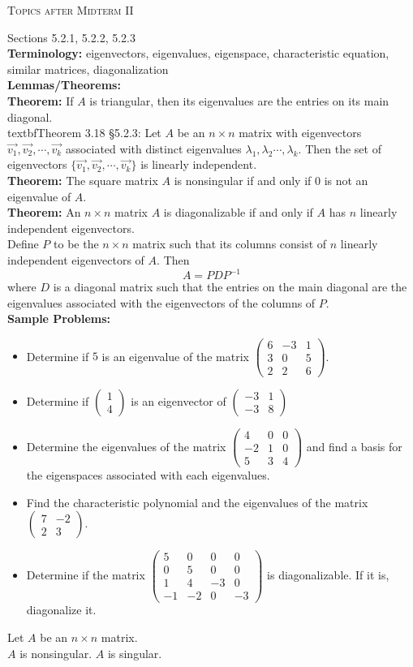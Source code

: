 \documentclass[11pt,fleqn]{article}
\newcommand{\bpm}{\begin{pmatrix}}
\newcommand{\epm}{\end{pmatrix}}
\begin{document}
\begin{center} \textsc{Topics after Midterm II} \end{center}

\noindent Sections 5.2.1, 5.2.2, 5.2.3\\

\textbf{Terminology:} eigenvectors, eigenvalues, eigenspace, characteristic equation, similar matrices, diagonalization\\

\textbf{Lemmas/Theorems:}\\
\textbf{Theorem:} If $A$ is triangular, then its eigenvalues are the entries on its main diagonal.\\
textbf{Theorem 3.18 \S 5.2.3:} Let $A$ be an $n \times n$ matrix with eigenvectors $\vec{v_1},\vec{v_2}, \cdots, \vec{v_k}$  associated with distinct eigenvalues $\lambda_1, \lambda_2\cdots,\lambda_k.$ Then the set  of eigenvectors $\{ \vec{v_1},\vec{v_2}, \cdots, \vec{v_k}\}$ is  linearly independent.\\
\textbf{Theorem:} The square matrix $A$ is nonsingular if and only if $0$ is not an eigenvalue of $A$.\\
\textbf{Theorem:} An $n \times n$ matrix $A$ is diagonalizable if and only if $A$ has $n$ linearly independent eigenvectors.\\
 
 Define $P$ to be the $n \times n$ matrix such that its columns consist of $n$ linearly independent eigenvectors of $A.$ Then $$A=PDP^{-1}$$ where $D$ is a diagonal matrix such that the entries on the main diagonal are the eigenvalues associated with the eigenvectors of the columns of $P.$\\

\textbf{Sample Problems:}\\
\begin{itemize}
\item Determine if $5$ is an eigenvalue of the matrix $\bpm 6&-3&1\\ 3&0&5 \\ 2&2&6 \epm$.
\item Determine if $\bpm 1\\4 \epm$ is an eigenvector of $\bpm -3&1\\-3&8\epm$
\item Determine the eigenvalues of the matrix $\bpm 4&0&0\\-2&1&0\\5&3&4 \epm$ and find a basis for the eigenspaces associated with each eigenvalues.
\item Find the characteristic polynomial and the eigenvalues of the matrix $\bpm 7&-2\\2&3\epm.$
\item Determine if the matrix $\bpm 5&0&0&0\\0&5&0&0\\1&4&-3&0\\-1&-2&0&-3\epm$ is diagonalizable. If it is, diagonalize it.
\end{itemize}
\newpage
Let $A$ be an $n \times n$ matrix.\\

$A$ is nonsingular. \hfill $A$ is singular.
\end{document}
